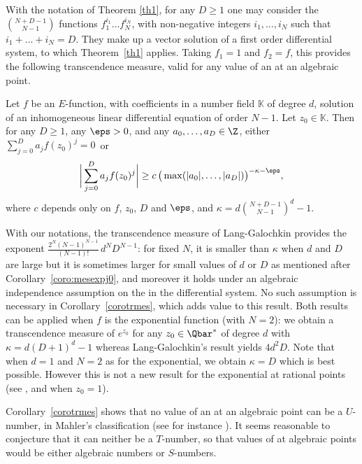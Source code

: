 With the notation of Theorem \ref{th1}, for any $D\geq 1$ one may consider the $\binom{N+D-1}{N-1 }$ functions $f_1^{i_1}\ldots f_N^{i_N}$, with non-negative integers $i_1,\ldots,i_N$ such that $i_1+\ldots+i_N=D$. They make up a vector solution of a first order differential system, to which Theorem~\ref{th1} applies. Taking $f_1=1$ and $f_2=f$, this provides the following transcendence measure, valid for any value of an \Efunction at an algebraic point.

\begin{coro} \label{corotrmes}
Let $f$ be an $E$-function, with coefficients in a number field $\mathbb{K}$ of degree $d$, solution of an inhomogeneous linear differential equation of order $N-1$. Let $z_0 \in \mathbb K$. Then for any $D\geq 1$, any $\eps>0$, and any $a_0,\ldots,a_D\in\Z$, either $\sum_{j=0}^D a_j f(z_0)^j=0$~or\vspace*{-3pt}\enlargethispage{.5\baselineskip}
\[
\bigg| \sum_{j=0}^D a_j f(z_0)^j \bigg| \geq c \, \big( \max( |a_0|,\ldots, |a_D|)\big)^{-\kappa-\eps},
\]
where $c$ depends only on $f$, $z_0$, $D$ and $\eps$, and
$\kappa = d \binom{N+D-1}{N-1} ^d -1$.
\end{coro}
With our notations, the transcendence measure of Lang-Galochkin provides the exponent $\frac{2^{N}(N-1)^{N-1}}{(N-1)!}\,d^{N}D^{N-1}$: for fixed $N$, it is smaller than $\kappa$ when $d$ and $D$ are large but it is sometimes larger for small values of $d$ or $D$ as mentioned after Corollary~\ref{coro:mesexpj0}, and moreover it holds under an algebraic independence assumption on the \Efunctions in the differential system. No such assumption is necessary in Corollary~\ref{corotrmes}, which adds value to this result. Both results can be applied when $f$ is the exponential function (with $N=2$): we obtain a transcendence measure of $e^{z_0}$ for any $z_0\in \Qbar^*$ of degree $d$ with $\kappa = d(D+1)^d-1$ whereas Lang-Galochkin's result yields $4d^2D$. Note that when $d=1$ and $N=2$ as for the exponential, we obtain $\kappa=D$ which is best possible. However this is not a new result for the exponential at rational points (see
\cite[Ch.\,10]{baker}, and \cite[p.\,135, Satz\,3]{mahler} when $z_0=1$).

Corollary~\ref{corotrmes} shows that no value of an \Efunction at an algebraic point can be a $U$-number, in Mahler's classification (see for instance \cite[Ch.\,3]{bugeaud}). It seems reasonable to conjecture that it can neither be a $T$-number, so that values of \Efunctions at algebraic points would be either algebraic numbers or $S$-numbers.

